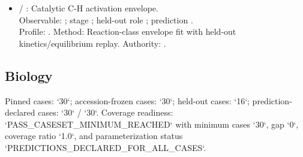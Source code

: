 \begin{itemize}
\item {} / : Catalytic C-H activation envelope.\\ Observable: ; stage ; held-out role ; prediction .\\ Profile: . Method: Reaction-class envelope fit with held-out kinetics/equilibrium replay. Authority: .
\end{itemize}

\subsection{Biology}
Pinned cases: `30`; accession-frozen cases: `30`; held-out cases: `16`; prediction-declared cases: `30` / `30`.
Coverage readiness: `PASS\_CASESET\_MINIMUM\_REACHED` with minimum cases `30`, gap `0`, coverage ratio `1.0`, and parameterization status `PREDICTIONS\_DECLARED\_FOR\_ALL\_CASES`.
